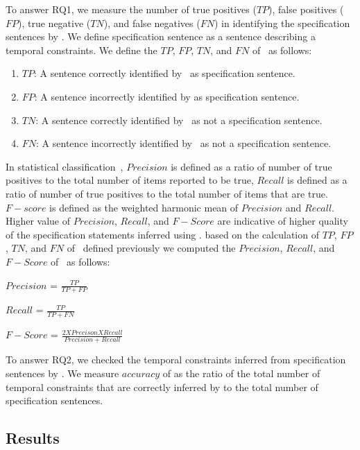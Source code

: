  


To answer RQ1, we measure the number of true positives ($TP$), false positives ($FP$), true negative ($TN$), and false negatives ($FN$)
in identifying the specification sentences by \tool.
We define specification sentence as a sentence describing a temporal constraints.
We define the $TP$, $FP$, $TN$, and $FN$ of \tool\ as follows:

\begin{enumerate}
	\item $TP$: A sentence correctly identified by \tool\ as specification sentence.
	\item $FP$: A sentence incorrectly identified by \tool as specification sentence.
	\item $TN$: A sentence correctly identified by \tool\ as not a specification sentence.
	\item $FN$: A sentence incorrectly identified by \tool\ as not a specification sentence.
\end{enumerate}


In statistical classification~\cite{Olson08}, $Precision$ is defined as a ratio of
number of true positives to the total number of items reported to be true,
$Recall$ is defined as a ratio of number of true positives to the total number
of items that are true. $F-score$ is defined as the weighted harmonic mean of 
$Precision$ and $Recall$. Higher value of $Precision$, $Recall$, and $F-Score$
are indicative of higher quality of the specification statements inferred using 
\tool. based on the calculation of $TP$, $FP$, $TN$, and $FN$ of \tool\ defined
previously we computed the $Precision$, $Recall$, and $F-Score$ of \tool\ as follows:


\begin{center}

$Precision$ = $\frac{TP}{TP + FP}$

$Recall$ = $\frac{TP}{TP + FN}$

$F-Score$ = $\frac{2 X Precison X Recall}{Precision + Recall}$
\end{center}


To answer RQ2, we checked the temporal constraints inferred from specification sentences by \tool.
We measure $accuracy$ of \tool as the ratio of the total number of temporal constraints that
are correctly inferred by \tool to the total number of specification sentences. 

\subsection{Results}

